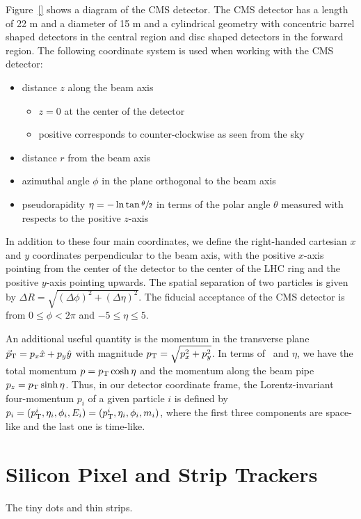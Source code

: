 Figure~\ref{} shows a diagram of the CMS detector.
The CMS detector has a length of 22 m and a diameter of 15 m and a cylindrical geometry with concentric barrel shaped detectors in the central region and disc shaped detectors in the forward region.
The following coordinate system is used when working with the CMS detector:
\begin{itemize}
\item distance $z$ along the beam axis
  \begin{itemize}
  \item $z=0$ at the center of the detector
  \item positive corresponds to counter-clockwise as seen from the sky
  \end{itemize}
\item distance $r$ from the beam axis
\item azimuthal angle $\phi$ in the plane orthogonal to the beam axis
  \item pseudorapidity $\eta = - \ln \tan\sfrac{\theta}{2}$ in terms of the polar angle $\theta$ measured with respects to the positive $z$-axis
\end{itemize}
In addition to these four main coordinates, we define the right-handed cartesian $x$ and $y$ coordinates perpendicular to the beam axis, with the positive $x$-axis pointing from the center of the detector to the center of the LHC ring and the positive $y$-axis pointing upwards. 
The spatial separation of two particles is given by $\Delta R = \sqrt{(\Delta\phi)^2 + (\Delta\eta)^2}$.
The fiducial acceptance of the CMS detector is from $0 \le \phi < 2\pi$ and $-5 \le \eta \le 5$.

An additional useful quantity is the momentum in the transverse plane ${\vec p}_{\mathrm{T}} = p_x \hat x + p_y \hat y$ with magnitude $p_{\mathrm{T}} = \sqrt{p_x^2 + p_y^2}$.
In terms of \pt\ and $\eta$, we have the total momentum $p = p_{\mathrm{T}} \cosh \eta$ and the momentum along the beam pipe $p_z = p_{\mathrm{T}} \sinh \eta$. 
Thus, in our detector coordinate frame, the Lorentz-invariant four-momentum $p_i$ of a given particle $i$ is defined by $p_i = (p_{\mathrm{T}}^i, \eta_i, \phi_i, E_i) = (p_{\mathrm{T}}^i, \eta_i, \phi_i, m_i)$, where the first three components are space-like and the last one is time-like. 


\section{Silicon Pixel and Strip Trackers}
\label{sec:cms_tracker}

The tiny dots and thin strips.

